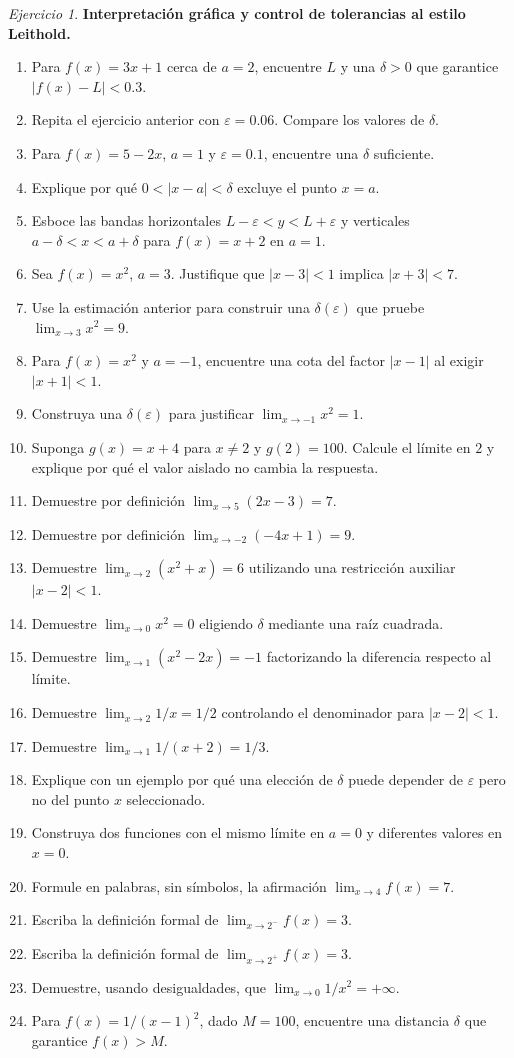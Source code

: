 \documentclass[12pt]{article}
\theoremstyle{remark}
\newtheorem{Ejer}{Ejercicio}
\begin{document}
\begin{Ejer}\textbf{Interpretación gráfica y control de tolerancias al estilo Leithold.}
\begin{enumerate}[series=banco]
\item Para $f(x)=3x+1$ cerca de $a=2$, encuentre $L$ y una $\delta>0$ que garantice $|f(x)-L|<0.3$.
\item Repita el ejercicio anterior con $\varepsilon=0.06$. Compare los valores de $\delta$.
\item Para $f(x)=5-2x$, $a=1$ y $\varepsilon=0.1$, encuentre una $\delta$ suficiente.
\item Explique por qué $0<|x-a|<\delta$ excluye el punto $x=a$.
\item Esboce las bandas horizontales $L-\varepsilon<y<L+\varepsilon$ y verticales $a-\delta<x<a+\delta$ para $f(x)=x+2$ en $a=1$.
\item Sea $f(x)=x^2$, $a=3$. Justifique que $|x-3|<1$ implica $|x+3|<7$.
\item Use la estimación anterior para construir una $\delta(\varepsilon)$ que pruebe $\lim_{x\to3}x^2=9$.
\item Para $f(x)=x^2$ y $a=-1$, encuentre una cota del factor $|x-1|$ al exigir $|x+1|<1$.
\item Construya una $\delta(\varepsilon)$ para justificar $\lim_{x\to-1}x^2=1$.
\item Suponga $g(x)=x+4$ para $x\ne2$ y $g(2)=100$. Calcule el límite en $2$ y explique por qué el valor aislado no cambia la respuesta.
\item Demuestre por definición $\lim_{x\to5}(2x-3)=7$.
\item Demuestre por definición $\lim_{x\to-2}(-4x+1)=9$.
\item Demuestre $\lim_{x\to2}(x^2+x)=6$ utilizando una restricción auxiliar $|x-2|<1$.
\item Demuestre $\lim_{x\to0}x^2=0$ eligiendo $\delta$ mediante una raíz cuadrada.
\item Demuestre $\lim_{x\to1}(x^2-2x)= -1$ factorizando la diferencia respecto al límite.
\item Demuestre $\lim_{x\to2}1/x=1/2$ controlando el denominador para $|x-2|<1$.
\item Demuestre $\lim_{x\to1}1/(x+2)=1/3$.
\item Explique con un ejemplo por qué una elección de $\delta$ puede depender de $\varepsilon$ pero no del punto $x$ seleccionado.
\item Construya dos funciones con el mismo límite en $a=0$ y diferentes valores en $x=0$.
\item Formule en palabras, sin símbolos, la afirmación $\lim_{x\to4}f(x)=7$.
\item Escriba la definición formal de $\lim_{x\to2^-}f(x)=3$.
\item Escriba la definición formal de $\lim_{x\to2^+}f(x)=3$.
\item Demuestre, usando desigualdades, que $\lim_{x\to0}1/x^2=+\infty$.
\item Para $f(x)=1/(x-1)^2$, dado $M=100$, encuentre una distancia $\delta$ que garantice $f(x)>M$.
\end{enumerate}
\end{Ejer}
\end{document}
